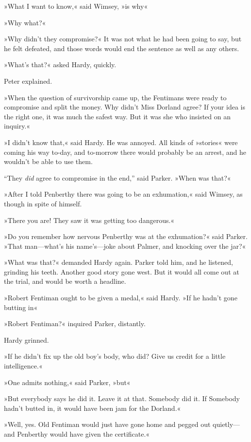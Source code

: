»What I want to know,« said Wimsey, »is why\longdash«

»Why what?«

»Why didn't they compromise?« It was not what he had been going to say, but he felt defeated, and those words would end the sentence as well as any others.

»What's that?« asked Hardy, quickly.

Peter explained.

»When the question of survivorship came up, the Fentimans were ready to compromise and split the money. Why didn't Miss Dorland agree? If your idea is the right one, it was much the safest way. But it was she who insisted on an inquiry.«

»I didn't know that,« said Hardy. He was annoyed. All kinds of »stories« were coming his way to-day, and to-morrow there would probably be an arrest, and he wouldn't be able to use them.

\enquote{They \textit{did} agree to compromise in the end,} said Parker. »When was that?«

»After I told Penberthy there was going to be an exhumation,« said Wimsey, as though in spite of himself.

»There you are! They saw it was getting too dangerous.«

»Do you remember how nervous Penberthy was at the exhumation?« said Parker. »That man\allowbreak---\allowbreak what's his name's\allowbreak---\allowbreak joke about Palmer, and knocking over the jar?«

»What was that?« demanded Hardy again. Parker told him, and he listened, grinding his teeth. Another good story gone west. But it would all come out at the trial, and would be worth a headline.

»Robert Fentiman ought to be given a medal,« said Hardy. »If he hadn't gone butting in\longdash«

»Robert Fentiman?« inquired Parker, distantly.

Hardy grinned.

»If he didn't fix up the old boy's body, who did? Give us credit for a little intelligence.«

»One admits nothing,« said Parker, »but\longdash«

»But everybody says he did it. Leave it at that. Somebody did it. If Somebody hadn't butted in, it would have been jam for the Dorland.«

»Well, yes. Old Fentiman would just have gone home and pegged out quietly\allowbreak---\allowbreak and Penberthy would have given the certificate.«

